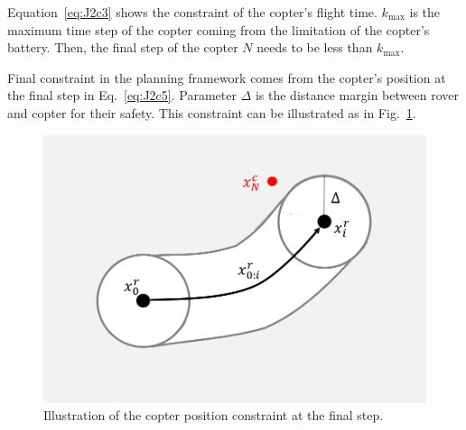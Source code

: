 \documentclass[conference]{IEEEtran}
\begin{document}
Equation~\eqref{eq:J2c3} shows the constraint of the copter's flight time. $k_{\max}$ is the maximum time step of the copter coming from the limitation of the copter's battery. Then, the final step of the copter $N$ needs to be less than $k_{\max}$.


Final constraint in the planning framework comes from the copter's position at the final step in Eq.~\eqref{eq:J2c5}. Parameter $\Delta$ is the distance margin between rover and copter for their safety. This constraint can be illustrated as in Fig.~\ref{fig:8_5}.

\begin{figure}[h]
		\centering
		\includegraphics[width=0.8\columnwidth]{figs/8_5.png}
		\caption{Illustration of the copter position constraint at the final step.}
		\label{fig:8_5}
\end{figure}



\end{document}
